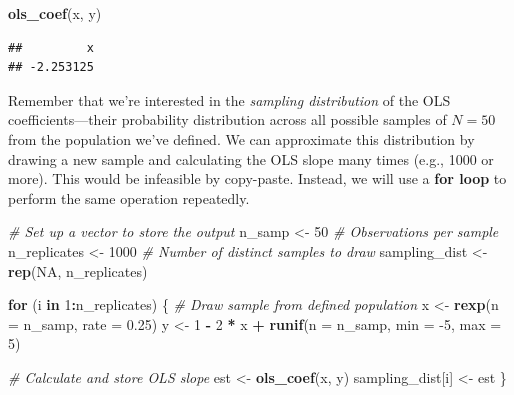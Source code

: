 \documentclass[
  12pt,
  oneside,openany]{book}
\newenvironment{Shaded}{\begin{snugshade}}{\end{snugshade}}
\newcommand{\CommentTok}[1]{\textcolor[rgb]{0.56,0.35,0.01}{\textit{#1}}}
\newcommand{\ControlFlowTok}[1]{\textcolor[rgb]{0.13,0.29,0.53}{\textbf{#1}}}
\newcommand{\DataTypeTok}[1]{\textcolor[rgb]{0.13,0.29,0.53}{#1}}
\newcommand{\DecValTok}[1]{\textcolor[rgb]{0.00,0.00,0.81}{#1}}
\newcommand{\FloatTok}[1]{\textcolor[rgb]{0.00,0.00,0.81}{#1}}
\newcommand{\KeywordTok}[1]{\textcolor[rgb]{0.13,0.29,0.53}{\textbf{#1}}}
\newcommand{\NormalTok}[1]{#1}
\newcommand{\OperatorTok}[1]{\textcolor[rgb]{0.81,0.36,0.00}{\textbf{#1}}}
\newcommand{\OtherTok}[1]{\textcolor[rgb]{0.56,0.35,0.01}{#1}}
\newcommand{\StringTok}[1]{\textcolor[rgb]{0.31,0.60,0.02}{#1}}
\begin{document}
\begin{Shaded}
\begin{Highlighting}[]
\KeywordTok{ols\_coef}\NormalTok{(x, y)}
\end{Highlighting}
\end{Shaded}

\begin{verbatim}
##         x 
## -2.253125
\end{verbatim}

Remember that we're interested in the \emph{sampling distribution} of the OLS coefficients---their probability distribution across all possible samples of \(N = 50\) from the population we've defined.
We can approximate this distribution by drawing a new sample and calculating the OLS slope many times (e.g., 1000 or more).
This would be infeasible by copy-paste.
Instead, we will use a \textbf{for loop} to perform the same operation repeatedly.

\begin{Shaded}
\begin{Highlighting}[]
\CommentTok{\# Set up a vector to store the output}
\NormalTok{n\_samp \textless{}{-}}\StringTok{ }\DecValTok{50}  \CommentTok{\# Observations per sample}
\NormalTok{n\_replicates \textless{}{-}}\StringTok{ }\DecValTok{1000}  \CommentTok{\# Number of distinct samples to draw}
\NormalTok{sampling\_dist \textless{}{-}}\StringTok{ }\KeywordTok{rep}\NormalTok{(}\OtherTok{NA}\NormalTok{, n\_replicates)}

\ControlFlowTok{for}\NormalTok{ (i }\ControlFlowTok{in} \DecValTok{1}\OperatorTok{:}\NormalTok{n\_replicates) \{}
  \CommentTok{\# Draw sample from defined population}
\NormalTok{  x \textless{}{-}}\StringTok{ }\KeywordTok{rexp}\NormalTok{(}\DataTypeTok{n =}\NormalTok{ n\_samp, }\DataTypeTok{rate =} \FloatTok{0.25}\NormalTok{)}
\NormalTok{  y \textless{}{-}}\StringTok{ }\DecValTok{1} \OperatorTok{{-}}\StringTok{ }\DecValTok{2} \OperatorTok{*}\StringTok{ }\NormalTok{x }\OperatorTok{+}\StringTok{ }\KeywordTok{runif}\NormalTok{(}\DataTypeTok{n =}\NormalTok{ n\_samp, }\DataTypeTok{min =} \DecValTok{{-}5}\NormalTok{, }\DataTypeTok{max =} \DecValTok{5}\NormalTok{)}

  \CommentTok{\# Calculate and store OLS slope}
\NormalTok{  est \textless{}{-}}\StringTok{ }\KeywordTok{ols\_coef}\NormalTok{(x, y)}
\NormalTok{  sampling\_dist[i] \textless{}{-}}\StringTok{ }\NormalTok{est}
\NormalTok{\}}
\end{Highlighting}
\end{Shaded}
\end{document}
